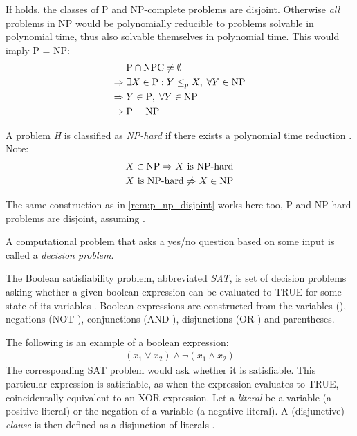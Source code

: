 \begin{remark}\label{rem:p_np_disjoint}
	If \ilmath{\pclass \neq \NP} holds, the classes of P and NP-complete problems are disjoint. Otherwise \emph{all} problems in NP would be polynomially reducible to problems solvable in polynomial time, thus also solvable themselves in polynomial time. This would imply P = NP: 
	\begin{align*}
		& \text{P} \cap \text{NPC} \neq \emptyset \\
		\Rightarrow \; & \exists X \in \text{P} : Y \leq_p X, \; \forall Y \in \text{NP} \\
		\Rightarrow \; & Y \in \text{P}, \; \forall Y \in \text{NP} \\
		\Rightarrow \; & \text{P} = \text{NP}
	\end{align*}
\end{remark}

\begin{definition}\label{def:np_hard}
	A problem \emph{H} is classified as \emph{NP-hard} if there exists a polynomial time reduction . Note:
	\begin{align*}
		X \in \text{NP} \Rightarrow X \text{ is NP-hard} \\
		X \text{ is NP-hard} \not\Rightarrow X \in \text{NP}
	\end{align*}
\end{definition}

\begin{remark}\label{rem:p_np_hard_disjoint}
	The same construction as in \cref{rem:p_np_disjoint} works here too, P and NP-hard problems are disjoint, assuming \ilmath{\pclass \neq \NP}.
\end{remark}

A computational problem that asks a yes/no question based on some input is called a \emph{decision problem}. 

The Boolean satisfiability problem, abbreviated \emph{SAT}, is set of decision problems asking whether a given boolean expression can be evaluated to TRUE for some state of its variables . 
Boolean expressions are constructed from the variables (), negations (NOT \ilmath{\neg}), conjunctions (AND \ilmath{\land}), disjunctions (OR \ilmath{\lor}) and parentheses. 

The following is an example of a boolean expression:
\begin{align}\label{ex:boolean_xor}
	(x_1 \lor x_2) \land \neg (x_1 \land x_2)
\end{align}
The corresponding SAT problem would ask whether it is satisfiable. This particular expression is satisfiable, as when  the expression evaluates to TRUE, coincidentally equivalent to an XOR expression.
Let a \emph{literal} be a variable  (a positive literal) or the negation of a variable  (a negative literal). A (disjunctive) \emph{clause} is then defined as a disjunction of literals . 

